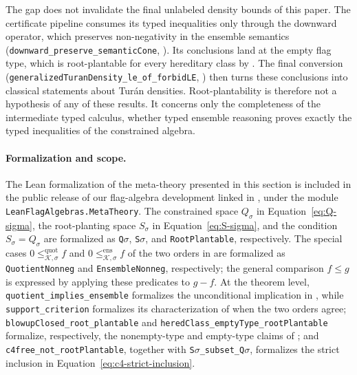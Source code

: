 \documentclass{article}
\newcommand{\lean}[1]{\texttt{#1}}
\begin{document}
The gap does not invalidate the final unlabeled density bounds of this
paper.  The
certificate pipeline consumes its typed inequalities only through the
downward operator, which preserves non-negativity in the ensemble
semantics
(\lean{downward\_\allowbreak preserve\_\allowbreak semanticCone},
).  Its conclusions land at the empty flag type,
which is root-plantable for every hereditary class by
.  The final conversion
(\lean{generalizedTuranDensity\_\allowbreak le\_\allowbreak of\_\allowbreak forbidLE},
) then turns these conclusions into classical
statements about Tur\'an densities.  Root-plantability is therefore not a
hypothesis of any of these results.  It concerns only the completeness of
the intermediate typed calculus, whether typed ensemble reasoning proves
exactly the typed inequalities of the constrained algebra.

\paragraph{Formalization and scope.}
The Lean formalization of the meta-theory presented in this section is included
in the public release of our flag-algebra development linked in
, under the module \lean{LeanFlagAlgebras.MetaTheory}.  The
constrained space \(Q_\sigma\) in Equation~\eqref{eq:Q-sigma}, the root-planting space
\(S_\sigma\) in Equation~\eqref{eq:S-sigma}, and the condition
\(S_\sigma=Q_\sigma\) are formalized as \lean{Q$\sigma$}, \lean{S$\sigma$}, and
\lean{RootPlantable}, respectively.  The special cases
\(0\leq^{\mathrm{quot}}_{\mathcal K,\sigma}f\) and
\(0\leq^{\mathrm{ens}}_{\mathcal K,\sigma}f\) of the two orders in
 are formalized as \lean{QuotientNonneg} and
\lean{EnsembleNonneg}, respectively; the general comparison \(f\leq g\) is
expressed by applying these predicates to \(g-f\).  At the theorem level,
\lean{quotient\_implies\_ensemble} formalizes the unconditional implication in
, while \lean{support\_criterion} formalizes
its characterization of when the two orders agree;
\lean{blowupClosed\_root\_plantable} and
\lean{heredClass\_emptyType\_rootPlantable} formalize, respectively, the
nonempty-type and empty-type claims of
; and
\lean{c4free\_not\_rootPlantable}, together with
\lean{S$\sigma$\_subset\_Q$\sigma$}, formalizes the strict inclusion in
Equation~\eqref{eq:c4-strict-inclusion}.
\end{document}
